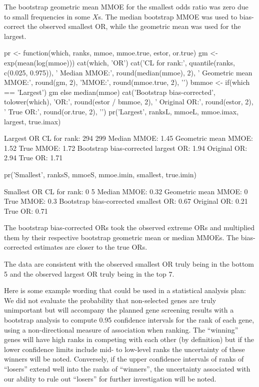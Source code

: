 The bootstrap geometric mean MMOE for the smallest odds ratio was zero
due to small frequencies in some $X$s.  The median bootstrap MMOE was
used to bias-correct the observed smallest OR, while the geometric
mean was used for the largest.
\begin{Schunk}
\begin{Sinput}
pr <- function(which, ranks, mmoe, mmoe.true, estor, or.true) {
  gm <- exp(mean(log(mmoe)))
  cat(which, 'OR\n')
  cat('CL for rank:', quantile(ranks, c(0.025, 0.975)),
      '  Median MMOE:', round(median(mmoe), 2),
      '  Geometric mean MMOE:', round(gm, 2),
      '\nTrue MMOE:', round(mmoe.true, 2), '\n')
  bmmoe <- if(which == 'Largest') gm else median(mmoe)
  cat('Bootstrap bias-corrected', tolower(which), 'OR:',
      round(estor / bmmoe, 2),
      '  Original OR:', round(estor, 2),
      '  True OR:', round(or.true, 2),
      '\n\n')
}
pr('Largest',  ranksL, mmoeL, mmoe.imax, largest,  true.imax)
\end{Sinput}
\begin{Soutput}
Largest OR
CL for rank: 294 299   Median MMOE: 1.45   Geometric mean MMOE: 1.52 
True MMOE: 1.72 
Bootstrap bias-corrected largest OR: 1.94   Original OR: 2.94   True OR: 1.71 
\end{Soutput}
\begin{Sinput}
pr('Smallest', ranksS, mmoeS, mmoe.imin, smallest, true.imin)
\end{Sinput}
\begin{Soutput}
Smallest OR
CL for rank: 0 5   Median MMOE: 0.32   Geometric mean MMOE: 0 
True MMOE: 0.3 
Bootstrap bias-corrected smallest OR: 0.67   Original OR: 0.21   True OR: 0.71 
\end{Soutput}
\end{Schunk}

The bootstrap bias-corrected ORs took the observed extreme ORs and
multiplied them by their respective bootstrap geometric mean or median
MMOEs.  The bias-corrected estimates are closer to the true ORs.

The data are consistent with the observed smallest OR truly being in the
bottom 5 and the observed largest OR truly being in the top 7.

Here is some example wording that could be used in a statistical
analysis plan: We did not evaluate the probability that non-selected genes
are truly unimportant but will accompany the planned gene screening
results with a bootstrap analysis to compute 0.95 confidence intervals
for the rank of each gene, using a non-directional measure of
association when ranking.  The ``winning'' genes will have high ranks in
competing with each other (by definition) but if the lower confidence
limits include mid- to low-level ranks the uncertainty of these
winners will be noted.  Conversely, if the upper confidence intervals
of ranks of ``losers'' extend well into the ranks of ``winners'', the
uncertainty associated with our ability to rule out ``losers'' for
further investigation will be noted. 
